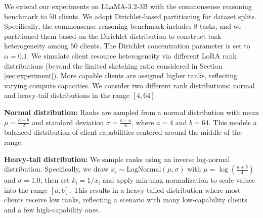 \documentclass{article} %
\theoremstyle{plain}
\theoremstyle{definition}
\begin{document}
We extend our experiments on LLaMA-3.2-3B with the commonsense reasoning benchmark to $50$ clients. We adopt Dirichlet-based partitioning for dataset splits.
Specifically, the commonsense reasoning benchmark includes $8$ tasks, and we partitioned them based on the Dirichlet distribution to construct task heterogeneity among $50$ clients. The Dirichlet concentration parameter is set to $\alpha = 0.1$.
We simulate client resource heterogeneity via different LoRA rank distributions (beyond the limited sketching ratio considered in Section \ref{sec:experiment}). More capable clients are assigned higher ranks, reflecting varying compute capacities. We consider two different rank distributions: normal and heavy-tail distributions in the range $[4, 64]$.

\textbf{Normal distribution:} Ranks are sampled from a normal distribution with mean $\mu = \frac{a + b}{2}$ and standard deviation $\sigma = \frac{b - a}{6}$, where $a=4$ and $b=64$.
This models a balanced distribution of client capabilities centered around the middle of the range.



\textbf{Heavy-tail distribution:} We sample ranks using an inverse log-normal distribution. Specifically, we draw $x_i \sim \text{LogNormal}(\mu, \sigma)$ with $\mu = \log\left(\frac{a + b}{4}\right)$ and $\sigma = 1.0$, then set $k_i = 1/x_i$ and apply min-max normalization to scale values into the range $[a, b]$. This results in a heavy-tailed distribution where most clients receive low ranks, reflecting a scenario with many low-capability clients and a few high-capability ones.
\end{document}
